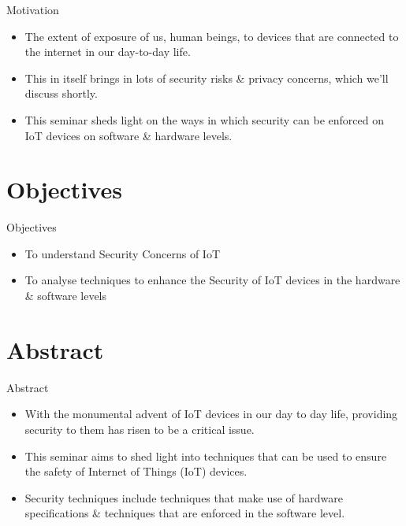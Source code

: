 \documentclass{beamer}
\begin{document}
\begin{frame}{Motivation}
    \begin{itemize}
        \item {The extent of exposure of us, human beings, to devices that are connected to the internet in our day-to-day life.}
        \item {This in itself brings in lots of security risks \& privacy concerns, which we'll discuss shortly.}
        \item {This seminar sheds light on the ways in which security can be enforced on IoT devices on software \& hardware levels.}
    \end{itemize}
\end{frame}

\section{Objectives}

\begin{frame}{Objectives}
    \begin{itemize}
        \item {To understand Security Concerns of IoT}
        \item {To analyse techniques to enhance the Security of IoT devices in the hardware \& software levels}
    
    \end{itemize}
\end{frame}

\section{Abstract}

\begin{frame}{Abstract}
    \begin{itemize}
        \item {With the monumental advent of IoT devices in our day to day life, providing security to them has risen to be a critical issue.}
        \item {This seminar aims to shed light into techniques that can be used to ensure the safety of Internet of Things (IoT) devices.}
        \item {Security techniques include techniques that make use of hardware specifications \& techniques that are enforced in the software level.}
    \end{itemize}
\end{frame}
\end{document}
